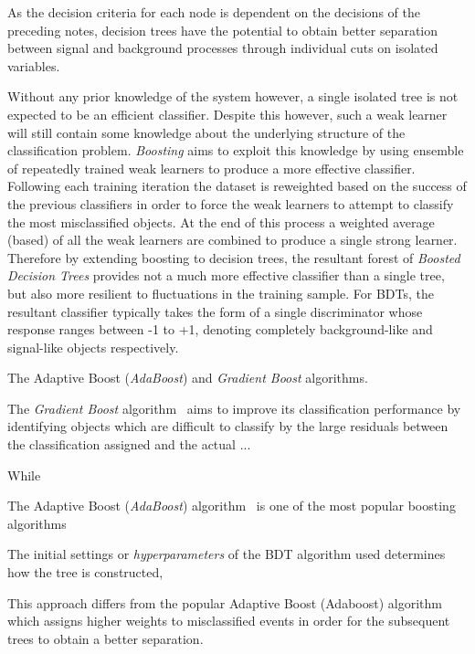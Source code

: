 As the decision criteria for each node is dependent on the decisions of the preceding notes, decision trees have the potential to obtain better separation between signal and background processes through individual cuts on isolated variables.


Without any prior knowledge of the system however, a single isolated tree is not expected to be an efficient classifier.
Despite this however, such a weak learner will still contain some knowledge about the underlying structure of the classification problem.
\emph{Boosting} aims to exploit this knowledge by using ensemble of repeatedly trained weak learners to produce a more effective classifier.
Following each training iteration the dataset is reweighted based on the success of the previous classifiers in order to force the weak learners to attempt to classify the most misclassified objects.
At the end of this process a weighted average (based) of all the weak learners are combined to produce a single strong learner.
Therefore by extending boosting to decision trees, the resultant forest of \emph{Boosted Decision Trees} provides not a much more effective classifier than a single tree, but also more resilient to fluctuations in the training sample.
For BDTs, the resultant classifier typically takes the form of a single discriminator whose response ranges between -1 to +1, denoting completely background-like and signal-like objects respectively.


The Adaptive Boost (\emph{AdaBoost}) and \emph{Gradient Boost} algorithms. 

The \emph{Gradient Boost} algorithm~\cite{Friedman:greedyfunction,Friedman:GradientBoosting} aims to improve its classification performance by identifying objects which are difficult to classify by the large residuals between the classification assigned and the actual ...


While 

The Adaptive Boost (\emph{AdaBoost}) algorithm~\cite{Friedman:additivelogistic} is one of the most popular boosting algorithms

The initial settings or \emph{hyperparameters} of the BDT algorithm used determines how the tree is constructed, 


This approach differs from the popular Adaptive Boost (Adaboost) algorithm which assigns higher weights to misclassified events in order for the subsequent trees to obtain a better separation.

